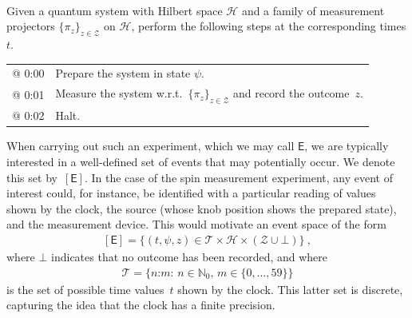 \documentclass[12pt]{article}
\theoremstyle{plain}
\theoremstyle{definition}
\newcommand*{\cH}{\mathcal{H}}
\newcommand*{\cT}{\mathcal{T}}
\newcommand*{\cZ}{\mathcal{Z}}
\newcommand*{\Exp}{\mathsf{E}}
\newcommand*{\BME}{\mathbf{BME}}
\newcommand*{\ExpBegin}[1]{
\vspace{0.2ex}
\begin{center}
\begin{minipage}{\linewidth}
\begin{framed}
\vspace{-0.6ex}
{\centering {\bf #1} \\ }
\vspace{1.1ex}
\nobreak}
\newcommand*{\ExpEnd}{
\vspace{-0.8ex}
\end{framed}
\end{minipage}
\end{center}
}
\begin{document}
\ExpBegin{Basic Measurement Experiment ($\BME$) }
  \noindent Given a quantum system with Hilbert space $\cH$ and a family of measurement projectors $\{\pi_z\}_{z \in \cZ}$ on $\cH$, perform the following steps at the corresponding times $t$.\footnotemark
 \vspace{1.4ex}

 \hspace{-0.6em}
\begin{tabular}{p{2.9em} p{}}
  @ 0:00 & Prepare the system in state $\psi$. \\
  @ 0:01 & Measure the system w.r.t.\  $\{\pi_z\}_{z \in \cZ}$ and record the outcome~$z$. \\
  @ 0:02 & Halt. 
\end{tabular}
\ExpEnd



When carrying out such an experiment, which we may call $\Exp$, we are typically interested in a well-defined set of events that may potentially occur. We denote this set by~$[\Exp]$. In the case of the spin measurement experiment, any  event of interest could, for instance, be identified with a particular reading of values shown by the clock, the source (whose knob position shows the prepared state), and the measurement device. This would motivate an event space of the form
\begin{align} \label{eq_BMEevents}
  [\Exp] = \bigl\{ (t, \psi, z) \in \cT \times \cH \times (\cZ \cup {\bot}) 
   \bigr\} \ ,
\end{align}
where  $\bot$ indicates that no outcome has been recorded, and where
\begin{align} \label{eq_timeset}
  \cT = \bigl\{\text{$n$:$m$}: \, n \in \mathbb{N}_0, \, m \in \{0, \ldots, 59\} \bigr\} 
\end{align}
is the set of possible time values~$t$ shown by the clock. This latter set is discrete, capturing the idea that the clock has a finite precision. 
\end{document}

